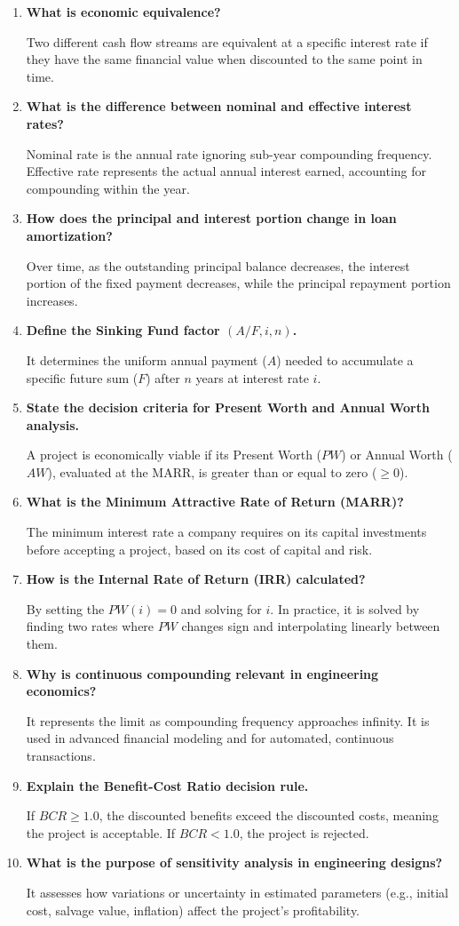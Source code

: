 \documentclass[12pt,a4paper]{article}
\newcommand{\Q}[1]{\textbf{#1}\par\noindent\ignorespaces}
\begin{document}
\begin{tcolorbox}[exambox, title={\textbf{Frequently Asked / Viva Questions}}]
\begin{enumerate}[topsep=0pt, label=\textbf{Q\arabic*.}, itemsep=5pt]
  \item \Q{What is economic equivalence?}
    Two different cash flow streams are equivalent at a specific interest rate if they have the same financial value when discounted to the same point in time.
  \item \Q{What is the difference between nominal and effective interest rates?}
    Nominal rate is the annual rate ignoring sub-year compounding frequency. Effective rate represents the actual annual interest earned, accounting for compounding within the year.
  \item \Q{How does the principal and interest portion change in loan amortization?}
    Over time, as the outstanding principal balance decreases, the interest portion of the fixed payment decreases, while the principal repayment portion increases.
  \item \Q{Define the Sinking Fund factor $(A/F, i, n)$.}
    It determines the uniform annual payment ($A$) needed to accumulate a specific future sum ($F$) after $n$ years at interest rate $i$.
  \item \Q{State the decision criteria for Present Worth and Annual Worth analysis.}
    A project is economically viable if its Present Worth ($PW$) or Annual Worth ($AW$), evaluated at the MARR, is greater than or equal to zero ($\ge 0$).
  \item \Q{What is the Minimum Attractive Rate of Return (MARR)?}
    The minimum interest rate a company requires on its capital investments before accepting a project, based on its cost of capital and risk.
  \item \Q{How is the Internal Rate of Return (IRR) calculated?}
    By setting the $PW(i) = 0$ and solving for $i$. In practice, it is solved by finding two rates where $PW$ changes sign and interpolating linearly between them.
  \item \Q{Why is continuous compounding relevant in engineering economics?}
    It represents the limit as compounding frequency approaches infinity. It is used in advanced financial modeling and for automated, continuous transactions.
  \item \Q{Explain the Benefit-Cost Ratio decision rule.}
    If $BCR \ge 1.0$, the discounted benefits exceed the discounted costs, meaning the project is acceptable. If $BCR < 1.0$, the project is rejected.
  \item \Q{What is the purpose of sensitivity analysis in engineering designs?}
    It assesses how variations or uncertainty in estimated parameters (e.g., initial cost, salvage value, inflation) affect the project's profitability.


\end{enumerate}
\end{tcolorbox}
\end{document}
